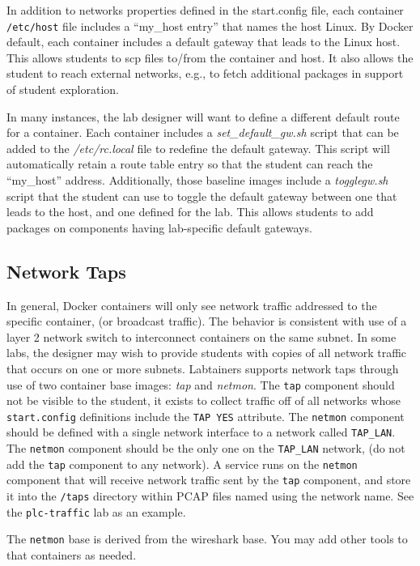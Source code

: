 \documentclass[12pt]{article}
\begin{document}
In addition to networks properties defined in the
start.config file, each container \texttt{/etc/host} file includes a ``my\_host entry'' that names
the host Linux.  By Docker default, each container includes a default gateway that
leads to the Linux host.  This allows students to scp files to/from the container and host.
It also allows the student to reach external networks, e.g., to fetch additional packages in
support of student exploration.

In many instances, the lab designer will want to define a different default route for a 
container.  Each container includes a \textit{set\_default\_gw.sh}
script that can be added to the \textit{/etc/rc.local} file to redefine the default gateway.
This script will automatically retain a route table entry so that the student can reach the ``my\_host''
address.  Additionally, those baseline images include a \textit{togglegw.sh} script that the student
can use to toggle the default gateway between one that leads to the host, and one defined for the lab.
This allows students to add packages on components having lab-specific default gateways.

\subsection{Network Taps}
In general, Docker containers will only see network traffic addressed to the specific container, (or 
broadcast traffic).  The behavior is consistent with use of a layer 2 network switch to interconnect
containers on the same subnet.  In some labs, the designer may wish to provide students with copies of
all network traffic that occurs on one or more subnets.  Labtainers supports network taps through use of
two container base images: \textit{tap} and \textit{netmon}.  The {\tt tap} component should not be visible
to the student, it exists to collect traffic off of all networks whose {\tt start.config} definitions include
the {\tt TAP YES} attribute.  The {\tt netmon} component should be defined with a single network interface
to a network called {\tt TAP\_LAN}.  The {\tt netmon} component should be the only one on the {\tt TAP\_LAN}
network, (do not add the {\tt tap} component to any network).  A service runs on the {\tt netmon} component
that will receive network traffic sent by the {\tt tap} component, and store it into the {\tt /taps} directory
within PCAP files named using the network name.  See the {\tt plc-traffic} lab as an example.

The {\tt netmon} base is derived from the wireshark base.  You may add other tools to that containers as needed.
\end{document}
